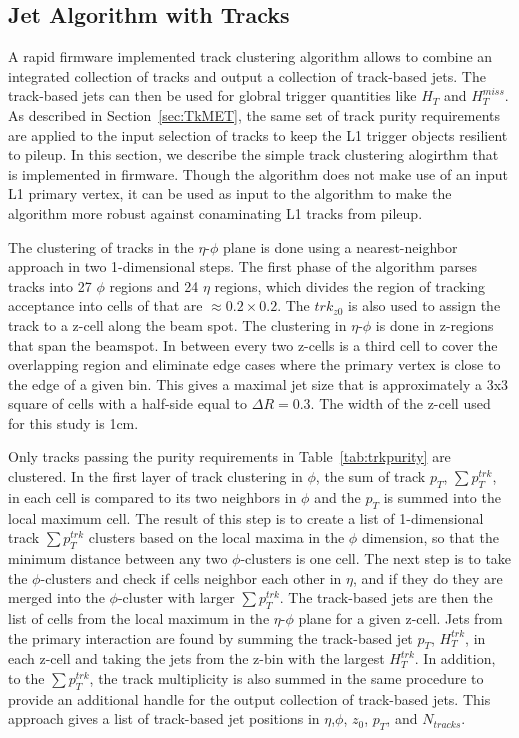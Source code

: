 \subsection{Jet Algorithm with Tracks}
\label{sec:TrkJets}

A rapid firmware implemented track clustering algorithm allows to combine an integrated collection of tracks and output a collection of track-based jets. The track-based jets can then be used for globral trigger quantities like $H_{T}$ and $H_{T}^{miss}$. As described in Section~\ref{sec:TkMET}, the same set of track purity requirements are applied to the input selection of tracks to keep the L1 trigger objects resilient to pileup. In this section, we describe the simple track clustering alogirthm that is implemented in firmware. Though the algorithm does not make use of an input L1 primary vertex, it can be used as input to the algorithm to make the algorithm more robust against conaminating L1 tracks from pileup. 

The clustering of tracks in the $\eta$-$\phi$ plane is done using a nearest-neighbor approach in two 1-dimensional steps. The first phase of the algorithm parses tracks into 27 $\phi$ regions and 24 $\eta$ regions, which divides the region of tracking acceptance into cells of that are $\approx 0.2\times 0.2$. The $trk_{z0} $ is also used to assign the track to a z-cell along the beam spot. The clustering in $\eta$-$\phi$ is done in z-regions that span the beamspot. In between every two z-cells is a third cell to cover the overlapping region and eliminate edge cases where the primary vertex is close to the edge of a given bin. This gives a maximal jet size that is approximately a 3x3 square of cells with a half-side equal to $\Delta R=0.3$. The width of the z-cell used for this study is 1cm. 

 Only tracks passing the purity requirements in Table~\ref{tab:trkpurity} are clustered. In the first layer of track clustering in $\phi$, the sum of track $p_{T}$, $\sum p_{T}^{trk}$, in each cell is compared to its two neighbors in $\phi$ and the $p_{T}$ is summed into the local maximum cell. The result of this step is to create a list of 1-dimensional track $\sum p_{T}^{trk}$ clusters based on the local maxima in the $\phi$ dimension, so that the minimum distance between any two $\phi$-clusters is one cell. The next step is to take the $\phi$-clusters and check if cells neighbor each other in $\eta$, and if they do they are merged into the $
\phi$-cluster with larger $\sum p_{T}^{trk}$. The track-based jets are then the list of cells from the local maximum in the $\eta$-$\phi$ plane for a given z-cell. Jets from the primary interaction are found by summing the track-based jet $p_{T}$, $H_{T}^{trk}$, in each z-cell and taking the jets from the z-bin with the largest $H_{T}^{trk}$.  In addition, to the $\sum p_{T}^{trk}$, the track multiplicity is also summed in the same procedure to provide an additional handle for the output collection of track-based jets. This approach gives a list of track-based jet positions in $\eta$,$\phi$, $z_{0}$, $p_{T}$, and $N_{tracks}$.

